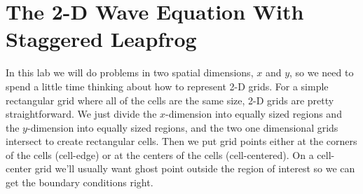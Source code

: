 \chapter{The 2-D Wave Equation With Staggered Leapfrog}
\label{Lab:15}



In this lab we will do problems in two spatial dimensions, $x$ and
$y$, so we need to spend a little time thinking about how to
represent 2-D grids.  For a simple rectangular grid where all of the
cells are the same size, 2-D grids are pretty straightforward. We
just divide the $x$-dimension into equally sized regions and the
$y$-dimension into equally sized regions, and the two one dimensional
grids intersect to create rectangular cells.  Then we put grid points
either at the corners of the cells (cell-edge) or at the centers of
the cells (cell-centered).  On a cell-center grid we'll usually want
ghost point outside the region of interest so we can get the boundary
conditions right.

